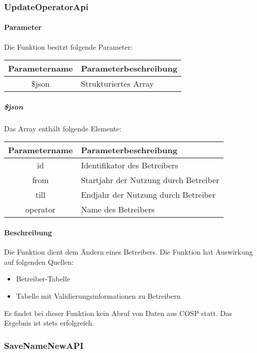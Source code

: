 \subsubsection{UpdateOperatorApi}
\paragraph{Parameter} Die Funktion besitzt folgende Parameter:
\begin{table}[H]
	\begin{tabular}{|c|p{11cm}|}
		\hline
		\textbf{Parametername} & \textbf{Parameterbeschreibung} \\ \hline
		\$json & Strukturiertes Array \\ \hline
	\end{tabular}
\end{table}
\subparagraph{\$json}Das Array enthält folgende Elemente:
\begin{table}[H]
	\begin{tabular}{|c|p{11cm}|}
		\hline
		\textbf{Parametername} & \textbf{Parameterbeschreibung} \\ \hline
		id & Identifikator des Betreibers \\ \hline
		from & Startjahr der Nutzung durch Betreiber \\ \hline
		till & Endjahr der Nutzung durch Betreiber \\ \hline
		operator & Name des Betreibers \\ \hline
	\end{tabular}
\end{table}
\paragraph{Beschreibung} Die Funktion dient dem Ändern eines Betreibers. Die Funktion hat Auswirkung auf folgenden Quellen:
\begin{itemize}
	\item Betreiber-Tabelle
	\item Tabelle mit Validierungsinformationen zu Betreibern
\end{itemize}
Es findet bei dieser Funktion kein Abruf von Daten aus {\glqq COSP\grqq} statt. Das Ergebnis ist stets erfolgreich.
\subsubsection{SaveNameNewAPI}
